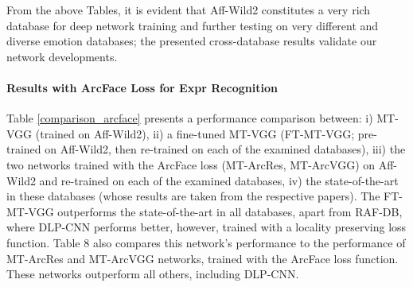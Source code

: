 \documentclass{bmvc2k}
\begin{document}
From the above Tables, it is evident that Aff-Wild2 constitutes a very rich database for deep network training and further testing on very different and diverse emotion databases; the presented cross-database results validate our network developments.

\paragraph{Results with ArcFace Loss for Expr Recognition}
Table \ref{comparison_arcface} presents a performance comparison between: i) MT-VGG (trained on Aff-Wild2), ii) a fine-tuned MT-VGG (FT-MT-VGG; pre-trained on Aff-Wild2, then re-trained on each of the examined databases), iii) the two networks trained with the ArcFace loss (MT-ArcRes, MT-ArcVGG) on Aff-Wild2 and re-trained on each of the examined databases, iv) the state-of-the-art in these databases (whose results are taken from the respective papers). The FT-MT-VGG outperforms the state-of-the-art in all databases, apart from RAF-DB, where DLP-CNN performs better, however, trained with a locality preserving loss function. Table 8 also compares this network's performance to the performance of MT-ArcRes and  MT-ArcVGG networks, trained with the ArcFace loss function. These networks outperform all others, including DLP-CNN.  





\begin{table}[h]
\caption{Retrained multi-task networks with ArcFace loss, for expression recognition } \label{comparison_arcface}
\centering
{}
\end{table}
\end{document}
